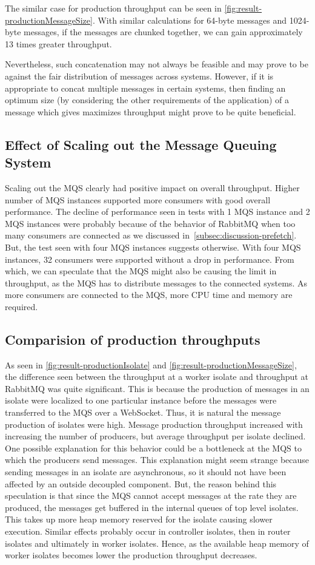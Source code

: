   The similar case for production throughput can be seen in \autoref{fig:result-productionMessageSize}. With similar calculations for 64-byte messages and 1024-byte messages, if the messages are chunked together, we can gain approximately 13 times greater throughput.

  Nevertheless, such concatenation may not always be feasible and may prove to be against the fair distribution of messages across systems. However, if it is appropriate to concat multiple messages in certain systems, then finding an optimum size (by considering the other requirements of the application) of a message which gives maximizes throughput might prove to be quite beneficial.

\subsection{Effect of Scaling out the Message Queuing System}
  Scaling out the MQS clearly had positive impact on overall throughput. Higher number of MQS instances supported more consumers with good overall performance. The decline of performance seen in tests with 1 MQS instance and 2 MQS instances were probably because of the behavior of RabbitMQ when too many consumers are connected as we discussed in~\autoref{subsec:discussion-prefetch}. But, the test seen with four MQS instances suggests otherwise. With four MQS instances, 32 consumers were supported without a drop in performance. From which, we can speculate that the MQS might also be causing the limit in throughput, as the MQS has to distribute messages to the connected systems. As more consumers are connected to the MQS, more CPU time and memory are required.

\subsection{Comparision of production throughputs}
  As seen in \autoref{fig:result-productionIsolate} and \autoref{fig:result-productionMessageSize}, the difference seen between the throughput at a worker isolate and throughput at RabbitMQ was quite significant. This is because the production of messages in an isolate were localized to one particular instance before the messages were transferred to the MQS over a WebSocket. Thus, it is natural the message production of isolates were high. Message production throughput increased with increasing the number of producers, but average throughput per isolate declined. One possible explanation for this behavior could be a bottleneck at the MQS to which the producers send messages. This explanation might seem strange because sending messages in an isolate are asynchronous, so it should not have been affected by an outside decoupled component. But, the reason behind this speculation is that since the MQS cannot accept messages at the rate they are produced, the messages get buffered in the internal queues of top level isolates. This takes up more heap memory reserved for the isolate causing slower execution. Similar effects probably occur in controller isolates, then in router isolates and ultimately in worker isolates. Hence, as the available heap memory of worker isolates becomes lower the production throughput decreases.

